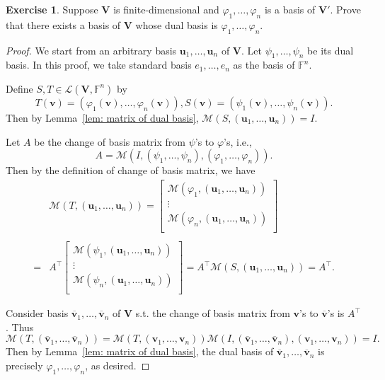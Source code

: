 \documentclass{tufte-handout}
\def \v {\vspace{0.2cm}}
\theoremstyle{plain} %
\theoremstyle{definition}
\newtheorem{exer}[thm]{Exercise}
\theoremstyle{remark}
\newcommand{\bra}[1]{\mathopen{}\left(#1\right)}
\renewcommand{\phi}{\varphi}
\newcommand{\F}{\mathbb{F}}
\newcommand{\mL}{\mathcal{L}}
\newcommand{\mM}{\mathcal{M}}
\newcommand{\V}{\bm{V}}
\renewcommand{\u}{\bm{u}}
\renewcommand{\v}{\bm{v}}
\begin{document}
\begin{exer}
	Suppose $\V$ is finite-dimensional and $\phi_1,\dots,\phi_n$ is a basis of $\V'$. Prove that there exists a basis of $\V$ whose dual basis is $\phi_1,\dots,\phi_n$.
\end{exer}
\begin{proof}
	We start from an arbitrary basis $\u_1,\dots,\u_n$ of $\V$. Let $\psi_1,\dots,\psi_n$ be its dual basis. In this proof, we take standard basis $e_1,\dots,e_n$ as the basis of $\F^n$.
	
	Define $S,T\in\mL\bra{\V,\F^n}$ by
	\[T(\v)=\bra{\phi_1(\v),\dots,\phi_n(\v)},S(\v)=\bra{\psi_1(\v),\dots,\psi_n(\v)}.\]
	Then by Lemma~\ref{lem: matrix of dual basis}, $\mM\bra{S,\bra{\u_1,\dots,\u_n}}=I$.
	
	Let $A$ be the change of basis matrix from $\psi$'s to $\phi$'s, i.e.,
	\[A=\mM\bra{I,\bra{\psi_1,\dots,\psi_n},\bra{\phi_1,\dots,\phi_n}}.\]
	Then by the definition of change of basis matrix, we have
	\begin{align*}
		&\mM\bra{T,\bra{\u_1,\dots,\u_n}}=\begin{bmatrix}
			\mM\bra{\phi_1,\bra{\u_1,\dots,\u_n}}\\
			\vdots\\
			\mM\bra{\phi_n,\bra{\u_1,\dots,\u_n}}\\
		\end{bmatrix}\\\\
		=&A^\intercal\begin{bmatrix}
			\mM\bra{\psi_1,\bra{\u_1,\dots,\u_n}}\\
			\vdots\\
			\mM\bra{\psi_n,\bra{\u_1,\dots,\u_n}}\\
		\end{bmatrix}=A^\intercal\mM\bra{S,\bra{\u_1,\dots,\u_n}}=A^\intercal.
	\end{align*}

	Consider basis $\overline{\v}_1,\dots,\overline{\v}_n$ of $\V$ s.t. the change of basis matrix from $\v$'s to $\overline{\v}$'s is $A^\intercal$. Thus
	\[\mM\bra{T,\bra{\overline{\v}_1,\dots,\overline{\v}_n}}=\mM\bra{T,\bra{\v_1,\dots,\v_n}}\mM\bra{I,\bra{\overline{\v}_1,\dots,\overline{\v}_n},\bra{\v_1,\dots,\v_n}}=I.\]
	Then by Lemma~\ref{lem: matrix of dual basis}, the dual basis of $\overline{\v}_1,\dots,\overline{\v}_n$ is precisely $\phi_1,\dots,\phi_n$, as desired.
\end{proof}
\end{document}
